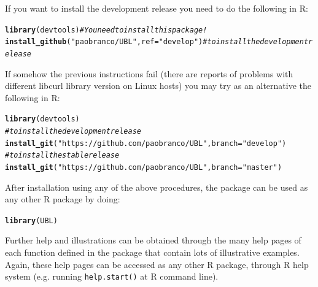 \documentclass[10pt,a4paper]{article}\usepackage[]{graphicx}\usepackage[]{color}
\makeatletter
\newcommand{\hlstr}[1]{\textcolor[rgb]{0.192,0.494,0.8}{#1}}%
\newcommand{\hlcom}[1]{\textcolor[rgb]{0.678,0.584,0.686}{\textit{#1}}}%
\newcommand{\hlstd}[1]{\textcolor[rgb]{0.345,0.345,0.345}{#1}}%
\newcommand{\hlkwc}[1]{\textcolor[rgb]{0.333,0.667,0.333}{#1}}%
\newcommand{\hlkwd}[1]{\textcolor[rgb]{0.737,0.353,0.396}{\textbf{#1}}}%
\newenvironment{kframe}{%
 \def\at@end@of@kframe{}%
 \ifinner\ifhmode%
  \def\at@end@of@kframe{\end{minipage}}%
  \begin{minipage}{\columnwidth}%
 \fi\fi%
 \def\FrameCommand##1{\hskip\@totalleftmargin \hskip-\fboxsep
 \colorbox{shadecolor}{##1}\hskip-\fboxsep
     \hskip-\linewidth \hskip-\@totalleftmargin \hskip\columnwidth}%
 \MakeFramed {\advance\hsize-\width
   \@totalleftmargin\z@ \linewidth\hsize
   \@setminipage}}%
 {\par\unskip\endMakeFramed%
 \at@end@of@kframe}
\newenvironment{knitrout}{}{} %
\makeatother
\begin{document}
If you want to install the development release you need to do the following in R:

\begin{knitrout}\footnotesize
{}\color{fgcolor}\begin{kframe}
\begin{alltt}
\hlkwd{library}\hlstd{(devtools)}  \hlcom{# You need to install this package!}
\hlkwd{install_github}\hlstd{(}\hlstr{"paobranco/UBL"}\hlstd{,}\hlkwc{ref}\hlstd{=}\hlstr{"develop"}\hlstd{)} \hlcom{# to install the development release}
\end{alltt}
\end{kframe}
\end{knitrout}


If somehow the previous instructions fail (there are reports of problems with different libcurl library version on Linux hosts) you may try as an alternative the following in R:
\begin{knitrout}\footnotesize
{}\color{fgcolor}\begin{kframe}
\begin{alltt}
\hlkwd{library}\hlstd{(devtools)}
\hlcom{# to install the development release}
\hlkwd{install_git}\hlstd{(}\hlstr{"https://github.com/paobranco/UBL"}\hlstd{,}\hlkwc{branch}\hlstd{=}\hlstr{"develop"}\hlstd{)}
\hlcom{# to install the stable release}
\hlkwd{install_git}\hlstd{(}\hlstr{"https://github.com/paobranco/UBL"}\hlstd{,}\hlkwc{branch}\hlstd{=}\hlstr{"master"}\hlstd{)}
\end{alltt}
\end{kframe}
\end{knitrout}

After installation using any of the above procedures, the package can be used as any other R package by doing:

\begin{knitrout}\footnotesize
{}\color{fgcolor}\begin{kframe}
\begin{alltt}
\hlkwd{library}\hlstd{(UBL)}
\end{alltt}
\end{kframe}
\end{knitrout}

Further help and illustrations can be obtained through the many help pages of each function defined in the package that contain lots of illustrative examples. Again, these help pages can be accessed as any other R package, through R help system (e.g. running \texttt{help.start()} at R command line).
\end{document}
